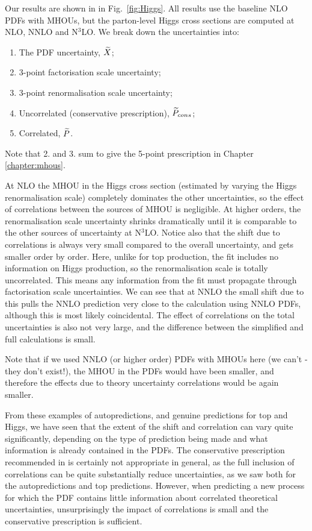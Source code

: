 Our results are shown in in Fig.~\ref{fig:Higgs}. All results use the baseline NLO PDFs with MHOUs, but the parton-level Higgs cross sections are computed at NLO, NNLO and N$^3$LO. We break down the uncertainties into: 
\begin{enumerate}
\item The PDF uncertainty, $\widetilde{X}$;
\item 3-point factorisation scale uncertainty; 
\item 3-point renormalisation scale uncertainty;
\item Uncorrelated (conservative prescription), $\widetilde{P}_{cons}$;
\item Correlated, $\widetilde{P}$.
\end{enumerate}
Note that 2. and 3. sum to give the 5-point prescription in Chapter \ref{chapter:mhous}. 

At NLO the MHOU in the Higgs cross section (estimated by varying the Higgs renormalisation scale) completely dominates the other uncertainties, so the effect of correlations between the sources of MHOU is negligible.  At higher orders, the renormalisation scale uncertainty shrinks dramatically until it is comparable to the other sources of uncertainty at N$^3$LO. Notice also that the shift due to correlations is always very small compared to the overall uncertainty, and gets smaller order by order. Here, unlike for top production, the fit includes no information on Higgs production, so the renormalisation scale is totally uncorrelated. This means any information from the fit must propagate through factorisation scale uncertainties. We can see that at NNLO the small shift due to this pulls the NNLO prediction very close to the calculation using NNLO PDFs, although this is most likely coincidental. The effect of correlations on the total uncertainties is also not very large, and the difference between the simplified and full calculations is small. 

Note that if we used NNLO (or higher order) PDFs with MHOUs here (we can't - they don't exist!), the MHOU in the PDFs would have been smaller, and therefore the effects due to theory uncertainty correlations would be again smaller.

From these examples of autopredictions, and genuine predictions for top and Higgs, we have seen that the extent of the shift and correlation can vary quite significantly, depending on the type of prediction being made and what information is already contained in the PDFs. The conservative prescription recommended in \cite{AbdulKhalek:2019ihb} is certainly not appropriate in general, as the full inclusion of correlations can be quite substantially reduce uncertainties, as we saw both for the autopredictions and top predictions. However, when predicting a new process for which the PDF contains little information about correlated theoretical uncertainties, unsurprisingly the impact of correlations is small and the conservative prescription is sufficient.

